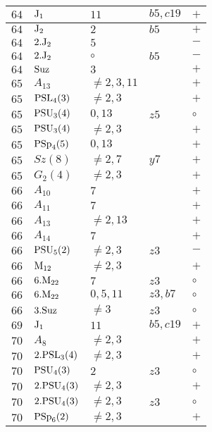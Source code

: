 \documentclass[a4paper, 11pt]{article}
\begin{document}
\begin{longtable}{lllll}
		$64$ & ${\rm J}_1$ & $11$ & $b5, c19$ & $+$ \\ \hline
		$64$ & ${\rm J}_2$ & $2$ & $b5$ & $+$ \\ \hline
		$64$ & $2.{\rm J}_2$ & $5$ &  & $-$ \\ \hline
		$64$ & $2.{\rm J}_2$ & $\circ$ & $b5$ & $-$ \\ \hline
		$64$ & ${\rm Suz}$ & $3$ &  & $+$ \\ \hline
		$65$ & $A_{13}$ & $\neq 2,3,11$ &  & $+$ \\ \hline
		$65$ & ${\rm PSL}_{4}(3)$ & $\neq 2,3$ &  & $+$ \\ \hline
		$65$ & ${\rm PSU}_{3}(4)$ & $0,13$ & $z5$ & $\circ$ \\ \hline
		$65$ & ${\rm PSU}_{3}(4)$ & $\neq 2,3$ &  & $+$ \\ \hline
		$65$ & ${\rm PSp}_{4}(5)$ & $0,13$ &  & $+$ \\ \hline
		$65$ & $Sz(8)$ & $\neq 2,7$ & $y7$ & $+$ \\ \hline
		$65$ & $G_{2}(4)$ & $\neq 2,3$ &  & $+$ \\ \hline
		$66$ & $A_{10}$ & $7$ &  & $+$ \\ \hline
		$66$ & $A_{11}$ & $7$ &  & $+$ \\ \hline
		$66$ & $A_{13}$ & $\neq 2,13$ &  & $+$ \\ \hline
		$66$ & $A_{14}$ & $7$ &  & $+$ \\ \hline
		$66$ & ${\rm PSU}_{5}(2)$ & $\neq 2,3$ & $z3$ & $-$ \\ \hline
		$66$ & ${\rm M}_{12}$ & $\neq 2,3$ &  & $+$ \\ \hline
		$66$ & $6.{\rm M}_{22}$ & $7$ & $z3$ & $\circ$ \\ \hline
		$66$ & $6.{\rm M}_{22}$ & $0,5,11$ & $z3, b7$ & $\circ$ \\ \hline
		$66$ & $3.{\rm Suz}$ & $\neq 3$ & $z3$ & $\circ$ \\ \hline
		$69$ & ${\rm J}_1$ & $11$ & $b5, c19$ & $+$ \\ \hline
		$70$ & $A_{8}$ & $\neq 2,3$ &  & $+$ \\ \hline
		$70$ & $2.{\rm PSL}_{3}(4)$ & $\neq 2,3$ &  & $+$ \\ \hline
		$70$ & ${\rm PSU}_{4}(3)$ & $2$ & $z3$ & $\circ$ \\ \hline
		$70$ & $2.{\rm PSU}_{4}(3)$ & $\neq 2,3$ &  & $+$ \\ \hline
		$70$ & $2.{\rm PSU}_{4}(3)$ & $\neq 2,3$ & $z3$ & $\circ$ \\ \hline
		$70$ & ${\rm PSp}_{6}(2)$ & $\neq 2,3$ &  & $+$ \\ \hline

\end{longtable}
\end{document}
